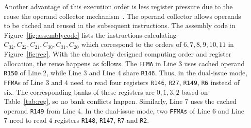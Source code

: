 Another advantage of this execution order is less register pressure due to the reuse  the operand collector mechanism~\cite{collector}. The operand collector allows operands to be cached and reused in the subsequent instructions.
The assembly code in Figure~\ref{fig:assemblycode} lists the instructions calculating $C_{32},C_{22}, C_{21}, C_{30},
C_{31}, C_{20}$ which correspond to the orders of $6,7,8,9,10,11$ in Figure~\ref{fig:reg}.
With the elaborately designed computing order and register allocation, the reuse happens as follows. The {\tt FFMA} in
Line $3$ uses cached operand {\tt R150} of Line $2$, while Line $3$ and Line $4$ share {\tt R146}. Thus, in the dual-issue mode,
{\tt FFMA}s of Line $3$ and $4$ need to read four registers {\tt R146}, {\tt R27}, {\tt R149}, {\tt R6} instead of six. The corresponding banks of these registers are $0,1,3,2$ based on Table~\ref{tab:reg}, so no bank conflicts happen.
Similarly, Line 7 uses the cached operand {\tt R149} from Line 4. In the dual-issue mode, two {\tt FFMAs} of Line 6 and
Line 7 need to read $4$ registers {\tt R148}, {\tt R147}, {\tt R7} and {\tt R2}.

